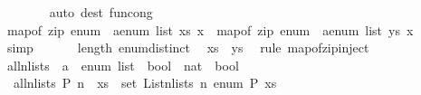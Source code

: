 \begin{isabellebody}
\ \ \ \ \ \ \isamarkupfalse%
\ {\isacharparenleft}{\kern0pt}auto\ dest{\isacharcolon}{\kern0pt}\ fun{\isacharunderscore}{\kern0pt}cong{\isacharparenright}{\kern0pt}\isanewline
\ \ \ \ \isamarkupfalse%
\ \isamarkupfalse%
\ {\isachardoublequoteopen}map{\isacharunderscore}{\kern0pt}of\ {\isacharparenleft}{\kern0pt}zip\ {\isacharparenleft}{\kern0pt}enum\ {\isacharcolon}{\kern0pt}{\isacharcolon}{\kern0pt}\ {\isacharprime}{\kern0pt}a{\isacharcolon}{\kern0pt}{\isacharcolon}{\kern0pt}enum\ list{\isacharparenright}{\kern0pt}\ xs{\isacharparenright}{\kern0pt}\ x\ {\isacharequal}{\kern0pt}\ map{\isacharunderscore}{\kern0pt}of\ {\isacharparenleft}{\kern0pt}zip\ {\isacharparenleft}{\kern0pt}enum\ {\isacharcolon}{\kern0pt}{\isacharcolon}{\kern0pt}\ {\isacharprime}{\kern0pt}a{\isacharcolon}{\kern0pt}{\isacharcolon}{\kern0pt}enum\ list{\isacharparenright}{\kern0pt}\ ys{\isacharparenright}{\kern0pt}\ x{\isachardoublequoteclose}\isanewline
\ \ \ \ \ \ \isamarkupfalse%
\ simp\isanewline
\ \ \isamarkupfalse%
\isanewline
\ \ \isamarkupfalse%
\ length\ enum{\isacharunderscore}{\kern0pt}distinct\ \isamarkupfalse%
\ {\isachardoublequoteopen}xs\ {\isacharequal}{\kern0pt}\ ys{\isachardoublequoteclose}\ \isamarkupfalse%
\ {\isacharparenleft}{\kern0pt}rule\ map{\isacharunderscore}{\kern0pt}of{\isacharunderscore}{\kern0pt}zip{\isacharunderscore}{\kern0pt}inject{\isacharparenright}{\kern0pt}\isanewline
{}\isamarkupfalse%
%
\endisatagproof
{\isafoldproof}%
%
\isadelimproof
\isanewline
%
\endisadelimproof
\isanewline
{}\isamarkupfalse%
\ all{\isacharunderscore}{\kern0pt}n{\isacharunderscore}{\kern0pt}lists\ {\isacharcolon}{\kern0pt}{\isacharcolon}{\kern0pt}\ {\isachardoublequoteopen}{\isacharparenleft}{\kern0pt}{\isacharparenleft}{\kern0pt}{\isacharprime}{\kern0pt}a\ {\isacharcolon}{\kern0pt}{\isacharcolon}{\kern0pt}\ enum{\isacharparenright}{\kern0pt}\ list\ {\isasymRightarrow}\ bool{\isacharparenright}{\kern0pt}\ {\isasymRightarrow}\ nat\ {\isasymRightarrow}\ bool{\isachardoublequoteclose}\isanewline
{}\isanewline
\ \ {\isachardoublequoteopen}all{\isacharunderscore}{\kern0pt}n{\isacharunderscore}{\kern0pt}lists\ P\ n\ {\isasymlongleftrightarrow}\ {\isacharparenleft}{\kern0pt}{\isasymforall}xs\ {\isasymin}\ set\ {\isacharparenleft}{\kern0pt}List{\isachardot}{\kern0pt}n{\isacharunderscore}{\kern0pt}lists\ n\ enum{\isacharparenright}{\kern0pt}{\isachardot}{\kern0pt}\ P\ xs{\isacharparenright}{\kern0pt}{\isachardoublequoteclose}\isanewline

\end{isabellebody}
